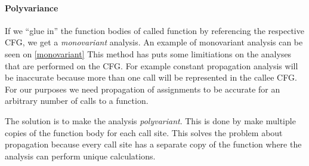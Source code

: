 \paragraph{Polyvariance}
If we ``glue in'' the function bodies of called function by referencing the respective CFG, we get a \emph{monovariant} analysis.
An example of monovariant analysis can be seen on \cref{monovariant}
This method has puts some limitiations on the analyses that are performed on the CFG.
For example constant propagation analysis will be inaccurate because more than one call will be represented in the callee CFG.
For our purposes we need propagation of assignments to be accurate for an arbitrary number of calls to a function.

The solution is to make the analysis \emph{polyvariant}.
This is done by make multiple copies of the function body for each call site.
This solves the problem about propagation because every call site has a separate copy of the function where the analysis can perform unique calculations.

